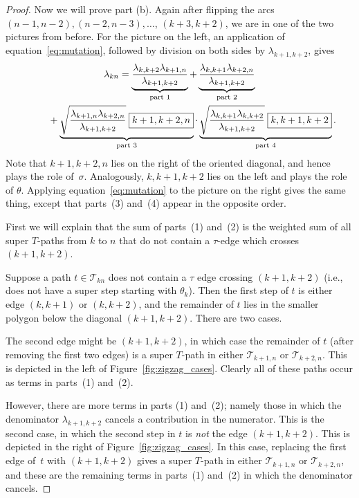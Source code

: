 \documentclass[11pt]{article}
\numberwithin{equation}{section}
\numberwithin{equation}{section}
\renewcommand{\l}[2]{\lambda_{#1#2}}
\begin{document}
\begin{proof}
 Now we will prove part (b). Again after flipping the arcs $(n-1,n-2), (n-2,n-3), \dots$, $(k+3,k+2)$, we are in one of the
 two pictures from before. For the picture on the left, an application of equation~\eqref{eq:mutation}, followed by division on both sides by $\lambda_{k+1,k+2}$, gives
 \begin{gather*}
 \l kn =
 \underbrace{
 \frac{\lambda_{k,k+2} \lambda_{k+1,n}}{\lambda_{k+1,k+2}}}_{\text{part 1}}
 +
 \underbrace{\frac{\lambda_{k,k+1} \lambda_{k+2,n}}{\lambda_{k+1,k+2}}}_{\text{part 2}}\nonumber \\
 \hphantom{\l kn =}{}+
 \underbrace{\sqrt{\frac{\lambda_{k+1,n} \lambda_{k+2,n}}{\lambda_{k+1,k+2}}}\; \boxed{k+1,k+2,n}}_{\text{part 3}}
 \cdot
 \underbrace{\sqrt{\frac{\lambda_{k,k+1} \lambda_{k,k+2}}{\lambda_{k+1,k+2}}}\; \boxed{k,k+1,k+2}}_{\text{part 4}}.%
 \end{gather*}
 Note that $\boxed{k+1,k+2,n}$ lies on the right of the oriented diagonal, and hence plays the role of~$\sigma$. Analogously,
 $\boxed{k,k+1,k+2}$ lies on the left and plays the role of $\theta$. Applying equation~\eqref{eq:mutation} to the picture on the right gives the same thing, except that parts~(3) and~(4) appear
 in the opposite order.

 First we will explain that the sum of parts~(1) and~(2) is the weighted sum of all super $T$-paths from $k$ to $n$
 that do not contain a $\tau$-edge which crosses $(k+1,k+2)$.

 Suppose a path $t \in \mathcal{T}_{kn}$ does not contain a $\tau$ edge crossing $(k+1,k+2)$ (i.e., does not have a super step starting with $\theta_k$).
 Then the first step of $t$ is either edge $(k,k+1)$ or $(k,k+2)$, and the remainder of $t$ lies in the smaller polygon below the diagonal $(k+1,k+2)$.
 There are two cases.

 The second edge might be $(k+1,k+2)$, in which case the remainder of $t$ (after removing the first two edges) is a super $T$-path
 in either $\mathcal{T}_{k+1,n}$ or $\mathcal{T}_{k+2,n}$. This is depicted in the left of Figure~\ref{fig:zigzag_cases}.
 Clearly all of these paths occur as terms in parts~(1) and~(2).

 However, there are more terms in parts (1) and~(2);
 namely those in which the denominator $\lambda_{k+1,k+2}$ cancels a contribution in the numerator. This is the
 second case, in which the second step in $t$ is \emph{not} the edge $(k+1,k+2)$. This is depicted in the right of Figure~\ref{fig:zigzag_cases}.
 In this case, replacing the first edge of~$t$ with $(k+1,k+2)$ gives
 a super $T$-path in either $\mathcal{T}_{k+1,n}$ or $\mathcal{T}_{k+2,n}$, and these are the remaining terms in parts~(1) and~(2) in which the denominator cancels.


\end{proof}
\end{document}
